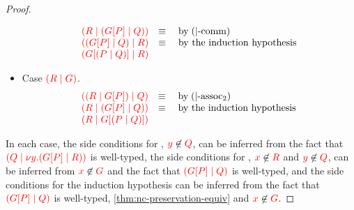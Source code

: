 \begin{proof}
\begin{itemize}
\[\begin{array}{ll}
        \textcolor{red}{(R \mid ({G}[{P}] \mid Q))} & \equiv \quad \text{by} \; (|\text{-comm}) \\
        \textcolor{red}{(({G}[{P}] \mid Q) \mid R)} & \equiv \quad \text{by the induction hypothesis} \\
        \textcolor{red}{({G}[{(P \mid Q)}] \mid R)} &
      \end{array}
    \]
  \item
    Case $\textcolor{red}{(R \mid G)}$.
    \[\!
      \begin{array}{ll}
        \textcolor{red}{((R \mid {G}[{P}]) \mid Q)} & \equiv \quad \text{by} \; (|\text{-assoc}_2) \\
        \textcolor{red}{(R \mid ({G}[{P}] \mid Q))} & \equiv \quad \text{by the induction hypothesis} \\
        \textcolor{red}{(R \mid {G}[{(P \mid Q)}])} &
      \end{array}
    \]
  \end{itemize}
  In each case, the side conditions for , $\textcolor{red}{y}\not\in\textcolor{red}{Q}$,
  can be inferred from the fact that
  $\textcolor{red}{(Q \mid \nu y.({G}[{P}] \mid R))}$ is well-typed, the side
  conditions for , $\textcolor{red}{x}\not\in\textcolor{red}{R}$ and $\textcolor{red}{y}\not\in\textcolor{red}{Q}$, can
  be inferred from $\textcolor{red}{x}\not\in\textcolor{red}{G}$ and the fact that
  $\textcolor{red}{({G}[{P}] \mid Q)}$ is well-typed, and the side conditions for
  the induction hypothesis can be inferred from the fact that
  $\textcolor{red}{({G}[{P}] \mid Q)}$ is well-typed,
  \cref{thm:nc-preservation-equiv} and $\textcolor{red}{x}\not\in\textcolor{red}{G}$. 
\end{proof}
